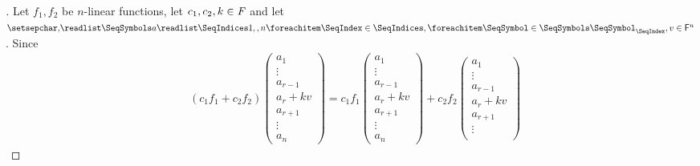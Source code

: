 \begin{proof}[]
  Let \(f_1, f_2\) be \(n\)-linear functions, let \(c_1, c_2, k \in \mathit{F}\) and let \(\seq{a}{1,,n}, v \in \vs{F}^n\).
  Since
  \begin{align*}
     & (c_1 f_1 + c_2 f_2)\begin{pmatrix}
                            a_1       \\
                            \vdots    \\
                            a_{r - 1} \\
                            a_r + kv  \\
                            a_{r + 1} \\
                            \vdots    \\
                            a_n
                          \end{pmatrix} = c_1 f_1\begin{pmatrix}
                                                   a_1       \\
                                                   \vdots    \\
                                                   a_{r - 1} \\
                                                   a_r + kv  \\
                                                   a_{r + 1} \\
                                                   \vdots    \\
                                                   a_n
                                                 \end{pmatrix} + c_2 f_2\begin{pmatrix}
                                                                          a_1       \\
                                                                          \vdots    \\
                                                                          a_{r - 1} \\
                                                                          a_r + kv  \\
                                                                          a_{r + 1} \\
                                                                          \vdots    \\

\end{pmatrix}
\end{align*}
\end{proof}
